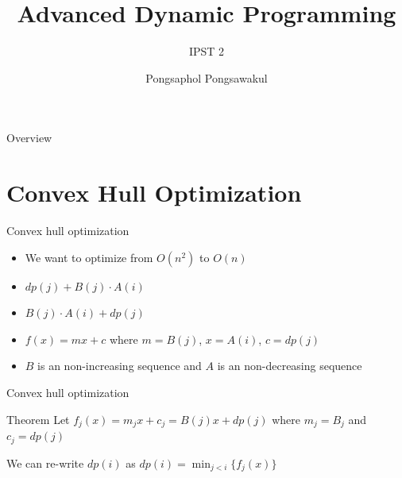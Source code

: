 \documentclass[aspectratio=169,xcolor=dvipsnames]{beamer}
\title[short title]{Advanced Dynamic Programming} %
\subtitle{IPST 2}
\author[Pin-Yen] {Pongsaphol Pongsawakul}
\date{} %
\begin{document}
\begin{frame}[plain]
    \titlepage
\end{frame}

\begin{frame}[plain]{Overview}
    \tableofcontents
\end{frame}

\section{Convex Hull Optimization}

\begin{frame}[plain]{Convex hull optimization}
    \begin{itemize}
        \begin{block}{Equation}
        $dp(i) = \displaystyle\min_{j<i}\{dp(j)+B(j)\cdot A(i)\}$ which $B(j) \geq B(j+1)$ and $A(i) \leq A(i+1)$
        \end{block}
        \item<2-> We want to optimize from $O(n^2)$ to $O(n)$
        \item<3-> $dp(j)+B(j)\cdot A(i)$
        \item<3-> $B(j)\cdot A(i) + dp(j)$
        \item<4-> $f(x) = mx+c$ where $m = B(j)$, $x = A(i)$, $c = dp(j)$
        \item<5-> $B$ is an non-increasing sequence and $A$ is an non-decreasing sequence
    \end{itemize}
\end{frame}

\begin{frame}[plain]{Convex hull optimization}

    \begin{block}{Theorem}
    Let $f_j(x) = m_jx + c_j = B(j)x + dp(j)$ where $m_j = B_j$ and $c_j = dp(j)$
        
    We can re-write $dp(i)$ as $dp(i) = \displaystyle\min_{j<i}\{f_j(x)\}$
    \end{block}
\end{frame}
\end{document}
